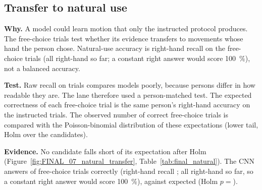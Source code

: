 
\subsection{Transfer to natural use}\label{app:final:natural}

\textbf{Why.}
A model could learn motion that only the instructed protocol produces.
The free-choice trials test whether its evidence transfers to movements whose hand the person chose.
Natural-use accuracy is right-hand recall on the free-choice trials (all right-hand so far; a constant right answer would score 100~\%), not a balanced accuracy.

\textbf{Test.}
Raw recall on  trials compares models poorly, because persons differ in how readable they are.
The lane therefore used a person-matched test.
The expected correctness of each free-choice trial is the same person's right-hand accuracy on the instructed trials.
The observed number of correct free-choice trials is compared with the Poisson-binomial distribution of these expectations (lower tail, Holm over the candidates).

\textbf{Evidence.}
No candidate falls short of its expectation after Holm (Figure~\ref{fig:FINAL_07_natural_transfer}, Table~\ref{tab:final_natural}).
The CNN answers  of  free-choice trials correctly (right-hand recall ; all right-hand so far, so a constant right answer would score 100~\%), against  expected (Holm $p = {}$).

